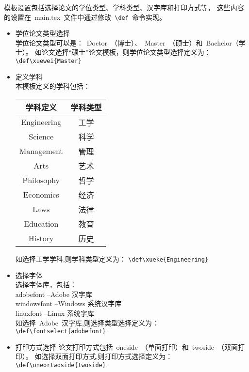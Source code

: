 模板设置包括选择论文的学位类型、学科类型、汉字库和打印方式等，
这些内容的设置在~main.tex~文件中通过修改~\verb|\def|~命令实现。
\begin{itemize}
\item 学位论文类型选择 \\
学位论文类型可以是：~Doctor~（博士）、~Master~（硕士）和~Bachelor（学士）。
如论文选择“硕士”论文模板，则学位论文类型选择定义为：
\verb|\def\xuewei{Master}|

\item 定义学科 \\
本模板定义的学科包括：
\begin{table}[htbp]
  \centering
  \vspace{0.2cm}
  \zhongwu
  \begin{tabular}{cc}
    \toprule
    学科定义  & 学科类型  \\
    \midrule
    Engineering   & 工学 \\
    Science       & 科学 \\
    Management    & 管理 \\
    Arts          & 艺术 \\
    Philosophy    & 哲学 \\
    Economics     & 经济 \\
    Laws          & 法律 \\
    Education     & 教育 \\
    History       & 历史 \\
    \bottomrule
  \end{tabular}
\end{table}

如选择工学学科,则学科类型定义为：
\verb|\def\xueke{Engineering}|

\item 选择字体 \\
选择字体库，包括：\\
adobefont --Adobe 汉字库 \\
windowsfont --Windows 系统汉字库 \\
linuxfont --Linux 系统字库 \\

如选择~Adobe~汉字库,则选择类型选择定义为：
\verb|\def\fontselect{adobefont}|

\item 打印方式选择
论文打印方式包括~oneside~（单面打印）和~twoside~（双面打印）。
如选择双面打印方式,则打印方式选择定义为：
\verb|\def\oneortwoside{twoside}|
\end{itemize}


